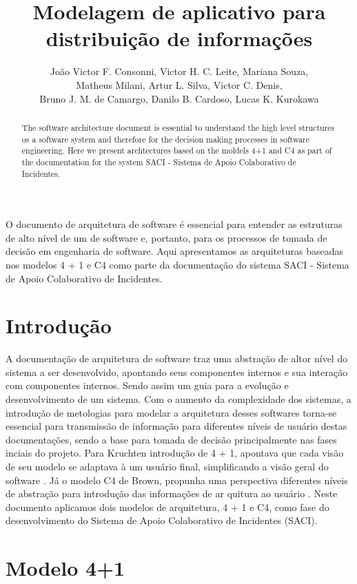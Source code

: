 \documentclass[12pt]{article}
\title{Modelagem de aplicativo para distribuição de informações}
\author{João Victor F. Consonni\inst{1}, Victor H. C. Leite\inst{1}, Mariana Souza\inst{1}, \\Matheus Milani\inst{1}, Artur L. Silva\inst{1}, Victor C. Denis\inst{1}, \\Bruno J. M. de Camargo\inst{1}, Danilo B. Cardoso\inst{1}, Lucas K. Kurokawa\inst{1}}
\begin{document}
 

\maketitle

\begin{abstract} 
The software architecture document is essential to understand the high level structures os a software system and therefore for the decision making processes in software engineering. Here we present archtectures  based on the moldels 4+1 and C4 as part of the documentation for the system SACI - Sistema de Apoio Colaborativo de Incidentes. 
\end{abstract}

\begin{resumo} 
O documento de arquitetura de software é essencial para entender as estruturas de alto nível de um de software e, portanto, para os processos de tomada de decisão em engenharia de software. Aqui apresentamos as arquiteturas baseadas nos modelos 4 + 1 e C4 como parte da documentação do sistema SACI - Sistema de Apoio Colaborativo de Incidentes.
\end{resumo}

\section{Introdução}

A documentação de arquitetura de software traz uma abstração de altor nível do sistema a ser desenvolvido, apontando seus componentes internos e sua interação com componentes internos. Sendo assim um guia para a evolução e desenvolvimento de um sistema. Com o aumento da complexidade dos sistemas, a introdução de metologias para modelar a arquitetura desses softwares torna-se essencial para transmissão de informação para diferentes níveis de usuário destas documentações, sendo a base para tomada de decisão principalmente nas fases inciais do projeto. Para Kruchten introdução de 4 + 1, apontava que cada visão de seu modelo se adaptava à um usuário final, simplificando a visão geral do software \cite{kruchten19954+}. Já o modelo C4 de Brown, propunha uma perspectiva diferentes níveis de abstração para introdução das informações de ar quitura ao usuário \cite{C4}. Neste documento aplicamos dois modelos de arquitetura, 4 + 1 e C4, como fase do desenvolvimento do Sistema de Apoio Colaborativo de Incidentes (SACI). 




\section{Modelo 4+1}
\end{document}
